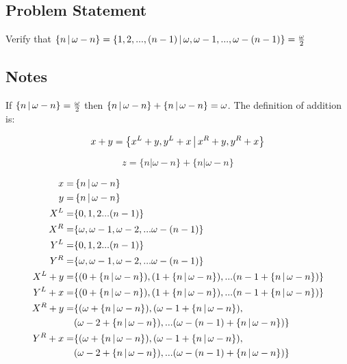 \subsection*{Problem Statement}

Verify that $\left\{n \,\middle|\, \omega - n\right\}
= \left\{1,2,...,(n - 1) \,\middle|\, \omega, \omega - 1, ..., \omega - (n - 1)\right\}
= \frac{\omega}{2}$

\subsection*{Notes}
If $\left\{n \,\middle|\, \omega - n\right\} = \frac{\omega}{2}$ then $\left\{n \,\middle|\, \omega - n\right\} + \left\{n \,\middle|\, \omega - n\right\}=\omega$.  The definition of addition is:

\begin{equation*}
    x + y = \left\{x^L + y, y^L + x \,\middle|\, x^R + y, y^R + x\right\}
\end{equation*}

\begin{equation*}
    z = \{n|\omega - n\} + \{n|\omega - n\}
\end{equation*}

\begin{align*}
    x = & \left\{n \,\middle|\, \omega - n\right\} \\
    y = & \left\{n \,\middle|\, \omega - n\right\} \\
    X^L = & \{ 0, 1, 2 ... (n - 1) \} \\
    X^R = & \{ \omega, \omega - 1, \omega - 2, ... \omega - (n - 1) \}\\
    Y^L = & \{ 0, 1, 2 ... (n - 1) \} \\
    Y^R = & \{ \omega, \omega - 1, \omega - 2, ... \omega - (n - 1) \} \\
    X^L + y = & \{ (0 + \left\{n \,\middle|\, \omega - n\right\}), (1 + \left\{n \,\middle|\, \omega - n\right\}), ... (n - 1 + \left\{n \,\middle|\, \omega - n\right\}) \} \\
    Y^L + x = & \{ (0 + \left\{n \,\middle|\, \omega - n\right\}), (1 + \left\{n \,\middle|\, \omega - n\right\}), ... (n - 1 + \left\{n \,\middle|\, \omega - n\right\}) \} \\
    X^R + y = & \{ (\omega + \left\{n \,\middle|\, \omega - n\right\}), (\omega - 1 + \left\{n \,\middle|\, \omega - n\right\}), \\ & (\omega - 2 + \left\{n \,\middle|\, \omega - n\right\}), ... (\omega - (n - 1) + \left\{n \,\middle|\, \omega - n\right\}) \} \\
    Y^R + x = & \{ (\omega + \left\{n \,\middle|\, \omega - n\right\}), (\omega - 1 + \left\{n \,\middle|\, \omega - n\right\}), \\ & (\omega - 2 + \left\{n \,\middle|\, \omega - n\right\}), ... (\omega - (n - 1) + \left\{n \,\middle|\, \omega - n\right\}) \}
\end{align*}


